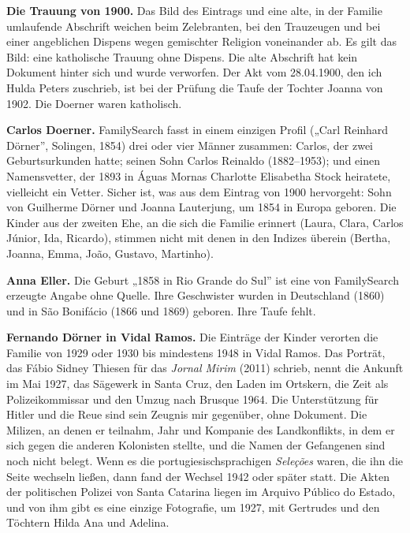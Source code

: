 \documentclass[
  ngerman,
  11pt,
  openany]{book}
\begin{document}
\textbf{Die Trauung von 1900.} Das Bild des Eintrags und eine alte, in
der Familie umlaufende Abschrift weichen beim Zelebranten, bei den
Trauzeugen und bei einer angeblichen Dispens wegen gemischter Religion
voneinander ab. Es gilt das Bild: eine katholische Trauung ohne Dispens.
Die alte Abschrift hat kein Dokument hinter sich und wurde verworfen.
Der Akt vom 28.04.1900, den ich Hulda Peters zuschrieb, ist bei der
Prüfung die Taufe der Tochter Joanna von 1902. Die Doerner waren
katholisch.

\textbf{Carlos Doerner.} FamilySearch fasst in einem einzigen Profil
(„Carl Reinhard Dörner'', Solingen, 1854) drei oder vier Männer
zusammen: Carlos, der zwei Geburtsurkunden hatte; seinen Sohn Carlos
Reinaldo (1882--1953); und einen Namensvetter, der 1893 in Águas Mornas
Charlotte Elisabetha Stock heiratete, vielleicht ein Vetter. Sicher ist,
was aus dem Eintrag von 1900 hervorgeht: Sohn von Guilherme Dörner und
Joanna Lauterjung, um 1854 in Europa geboren. Die Kinder aus der zweiten
Ehe, an die sich die Familie erinnert (Laura, Clara, Carlos Júnior, Ida,
Ricardo), stimmen nicht mit denen in den Indizes überein (Bertha,
Joanna, Emma, João, Gustavo, Martinho).

\textbf{Anna Eller.} Die Geburt „1858 in Rio Grande do Sul'' ist eine
von FamilySearch erzeugte Angabe ohne Quelle. Ihre Geschwister wurden in
Deutschland (1860) und in São Bonifácio (1866 und 1869) geboren. Ihre
Taufe fehlt.

\textbf{Fernando Dörner in Vidal Ramos.} Die Einträge der Kinder
verorten die Familie von 1929 oder 1930 bis mindestens 1948 in Vidal
Ramos. Das Porträt, das Fábio Sidney Thiesen für das \emph{Jornal Mirim}
(2011) schrieb, nennt die Ankunft im Mai 1927, das Sägewerk in Santa
Cruz, den Laden im Ortskern, die Zeit als Polizeikommissar und den Umzug
nach Brusque 1964. Die Unterstützung für Hitler und die Reue sind sein
Zeugnis mir gegenüber, ohne Dokument. Die Milizen, an denen er teilnahm,
Jahr und Kompanie des Landkonflikts, in dem er sich gegen die anderen
Kolonisten stellte, und die Namen der Gefangenen sind noch nicht belegt.
Wenn es die portugiesischsprachigen \emph{Seleções} waren, die ihn die
Seite wechseln ließen, dann fand der Wechsel 1942 oder später statt. Die
Akten der politischen Polizei von Santa Catarina liegen im Arquivo
Público do Estado, und von ihm gibt es eine einzige Fotografie, um 1927,
mit Gertrudes und den Töchtern Hilda Ana und Adelina.
\end{document}
